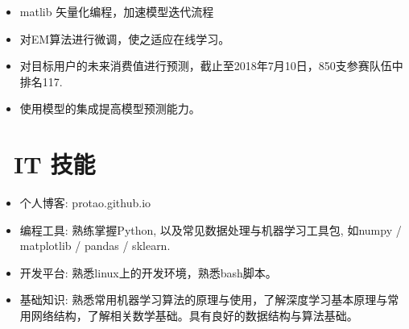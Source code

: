 \documentclass{resume}
\begin{document}
\begin{onehalfspacing}
\begin{itemize}
  \item matlib 矢量化编程，加速模型迭代流程
  \item 对EM算法进行微调，使之适应在线学习。
\end{itemize}
\end{onehalfspacing}

\begin{onehalfspacing}
\begin{itemize}
  \item 对目标用户的未来消费值进行预测，截止至2018年7月10日，850支参赛队伍中排名117.
  \item 使用模型的集成提高模型预测能力。
\end{itemize}
\end{onehalfspacing}


\section{\faCircleO\ IT 技能}
\begin{itemize}[parsep=0.5ex]
  \item 个人博客: protao.github.io
  \item 编程工具: 熟练掌握Python, 以及常见数据处理与机器学习工具包, 如numpy / matplotlib / pandas / sklearn.
  \item 开发平台: 熟悉linux上的开发环境，熟悉bash脚本。
  \item 基础知识: 熟悉常用机器学习算法的原理与使用，了解深度学习基本原理与常用网络结构，了解相关数学基础。具有良好的数据结构与算法基础。
\end{itemize}

%
%
\end{document}
